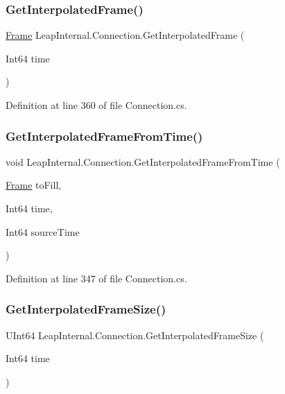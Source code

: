 \subsubsection{\texorpdfstring{GetInterpolatedFrame()}{GetInterpolatedFrame()}\hspace{0.1cm}{\footnotesize\ttfamily [2/2]}}
{\footnotesize\ttfamily \mbox{\hyperlink{class_leap_1_1_frame}{Frame}} Leap\+Internal.\+Connection.\+Get\+Interpolated\+Frame (\begin{DoxyParamCaption}\item[{Int64}]{time }\end{DoxyParamCaption})}



Definition at line 360 of file Connection.\+cs.

\mbox{\label{class_leap_internal_1_1_connection_a810b5d68c8fc21d2080a3cc60ad50520}} 
\subsubsection{\texorpdfstring{GetInterpolatedFrameFromTime()}{GetInterpolatedFrameFromTime()}}
{\footnotesize\ttfamily void Leap\+Internal.\+Connection.\+Get\+Interpolated\+Frame\+From\+Time (\begin{DoxyParamCaption}\item[{\mbox{\hyperlink{class_leap_1_1_frame}{Frame}}}]{to\+Fill,  }\item[{Int64}]{time,  }\item[{Int64}]{source\+Time }\end{DoxyParamCaption})}



Definition at line 347 of file Connection.\+cs.

\mbox{\label{class_leap_internal_1_1_connection_aa148c941081bf9d79516bdba29f4195a}} 
\subsubsection{\texorpdfstring{GetInterpolatedFrameSize()}{GetInterpolatedFrameSize()}}
{\footnotesize\ttfamily U\+Int64 Leap\+Internal.\+Connection.\+Get\+Interpolated\+Frame\+Size (\begin{DoxyParamCaption}\item[{Int64}]{time }\end{DoxyParamCaption})}



